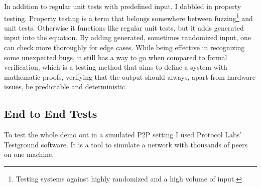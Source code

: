 In addition to regular unit tests with predefined input, I dabbled in property testing. Property testing is a term that belongs somewhere between fuzzing\footnote{Testing systems against highly randomized and a high volume of input.} and unit tests. Otherwise it functions like regular unit tests, but it adds generated input into the equation. By adding generated, sometimes randomized input, one can check more thoroughly for edge cases. While being effective in recognizing some unexpected bugs, it still has a way to go when compared to formal verification, which is a testing method that aims to define a system with mathematic proofs, verifying that the output should always, apart from hardware issues, be predictable and deterministic.

\subsection{End to End Tests}
To test the whole demo out in a simulated P2P setting I used Protocol Labs' Testground software. It is a tool to simulate a network with thousands of peers on one machine.

